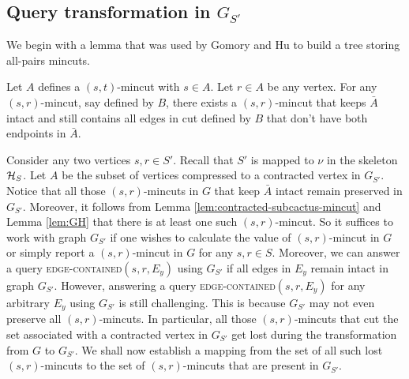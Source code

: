 \vspace{-8mm}
\subsection{Query transformation in \texorpdfstring{$G_{S'}$}{compact graph}}

We begin with a lemma that was used by Gomory and Hu to build a tree storing all-pairs mincuts. 

\begin{lemma}
Let $A$ defines a $(s,t)$-mincut with $s\in A$. Let $r\in A$ be any vertex.
For any $(s,r)$-mincut, say defined by $B$, there exists a $(s,r)$-mincut that keeps $\bar A$ intact and still contains all edges in cut defined by $B$ that don't have both endpoints in $\bar A$.
\label{lem:GH}
\end{lemma}

Consider any two vertices $s,r\in S'$. Recall that $S'$ is mapped to $\nu$ in the skeleton ${\cal H}_S$. 
Let $A$ be the subset of vertices compressed to a contracted vertex in $G_{S'}$. Notice that all those $(s,r)$-mincuts in $G$ that keep $\bar{A}$ intact remain preserved in $G_{S'}$. Moreover, it follows from Lemma \ref{lem:contracted-subcactus-mincut} and Lemma \ref{lem:GH} that there is at least one such $(s,r)$-mincut. So it suffices to work with graph $G_{S'}$ if one wishes to calculate the value of $(s,r)$-mincut in $G$ or simply report a $(s,r)$-mincut in $G$
for any $s,r\in S$. Moreover, we can answer a query \textsc{edge-contained}$(s,r,E_y)$ using $G_{S'}$ if all edges in $E_y$ remain intact in graph $G_{S'}$. 
However, answering a query \textsc{edge-contained}$(s,r,E_{y})$ for any arbitrary $E_y$ using $G_{S'}$ is still challenging. This is because 
$G_{S'}$ may not even preserve all $(s,r)$-mincuts. In particular, all those $(s,r)$-mincuts that cut the set associated with a contracted vertex in $G_{S'}$ get lost during the transformation from $G$ to $G_{S'}$. We shall now establish a mapping from the set of all such lost $(s,r)$-mincuts to the set of $(s,r)$-mincuts that are present in $G_{S'}$. 

